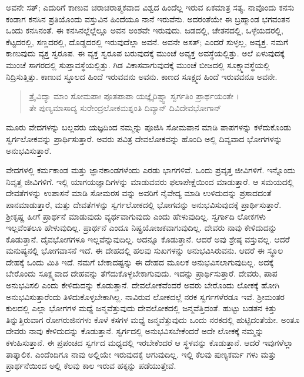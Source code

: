 ಅವನೇ ಸತ್​; ಎದುರಿಗೆ ಕಾಣುವ ಚರಾಚರಾತ್ಮಕವಾದ ವಿಶ್ವದ ಹಿಂದೆಲ್ಲ ಇರುವ ಏಕಮಾತ್ರ ಸತ್ಯ. ನಾವೊಂದು ಕನಸು ಕಂಡಾಗ ಕನಸಿನ ಪ್ರತಿಯೊಂದು ವಸ್ತುವಿನ ಹಿಂದೆಯೂ ನಾನೆ ಇರುವೆನು. ಅದರಂತೆಯೇ ಈ ಬ್ರಹ್ಮಾಂಡ ಭಗವಂತನ ಒಂದು ಕನಸಿನಂತೆ. ಈ ಕನಸಿನಲ್ಲೆಲ್ಲೆಲ್ಲೂ ಅವನ ಅಂಶವೇ ಇರುವುದು. ಜಡದಲ್ಲಿ, ಚೇತನದಲ್ಲಿ, ಒಳ್ಳೆಯದರಲ್ಲಿ, ಕೆಟ್ಟದರಲ್ಲಿ, ಸಣ್ಣದರಲ್ಲಿ, ದೊಡ್ಡದರಲ್ಲಿ ಇರುವುದೆಲ್ಲಾ ಅವನೆ. ಅವನೇ ಅಸತ್​; ಎಂದರೆ ಸುಳ್ಳಲ್ಲ, ಅವ್ಯಕ್ತ. ನಮಗೆ ಕಾಣುವುದು ವ್ಯಕ್ತ ಸ್ವರೂಪ. ಈ ವ್ಯಕ್ತ ಸ್ವರೂಪ ಬರುವುದಕ್ಕೆ ಮುಂಚೆ ಅವ್ಯಕ್ತ ಅವಸ್ಥೆಯಲ್ಲಿತ್ತು. ಅಲೆ ಏಳುವುದಕ್ಕೆ ಮುಂಚೆ ಸಾಗರದಲ್ಲಿ ಸುಪ್ತಾವಸ್ಥೆಯಲ್ಲಿತ್ತು. ಗಿಡ ವಿಕಾಸವಾಗುವುದಕ್ಕೆ ಮುಂಚೆ ಬೀಜದಲ್ಲಿ ಸೂಕ್ಷ್ಮಾವಸ್ಥೆಯಲ್ಲಿ ನಿದ್ರಿಸುತ್ತಿತ್ತು. ಕಾಣುವ ಸ್ಥೂಲದ ಹಿಂದೆ ಇರುವವನು ಅವನು. ಕಾಣದ ಸೂಕ್ಷ್ಮದ ಹಿಂದೆ ಇರುವವನೂ ಅವನೇ.

\begin{verse}
ತ್ರೈವಿದ್ಯಾ ಮಾಂ ಸೋಮಪಾಃ ಪೂತಪಾಪಾ ಯಜ್ಞೈರಿಷ್ಟ್ವಾ ಸ್ವರ್ಗತಿಂ ಪ್ರಾರ್ಥಯಂತೇ ।\\ತೇ ಪುಣ್ಯಮಾಸಾದ್ಯ ಸುರೇಂದ್ರಲೋಕಮಶ್ನಂತಿ ದಿವ್ಯಾನ್ ದಿವಿದೇವಭೋಗಾನ್ 
\end{verse}

{\small ಮೂರು ವೇದಗಳನ್ನು ಬಲ್ಲವರು ಯಜ್ಞದಿಂದ ನಮ್ಮನ್ನು ಪೂಜಿಸಿ ಸೋಮಪಾನ ಮಾಡಿ ಪಾಪಗಳನ್ನು ಕಳೆದುಕೊಂಡು ಸ್ವರ್ಗಲೋಕವನ್ನು ಪ್ರಾರ್ಥಿಸುತ್ತಾರೆ. ಅವರು ಪವಿತ್ರ ದೇವಲೋಕವನ್ನು ಹೊಂದಿ ಅಲ್ಲಿ ದಿವ್ಯವಾದ ಭೋಗಗಳನ್ನು ಅನುಭವಿಸುತ್ತಾರೆ.}

ವೇದಗಳಲ್ಲಿ ಕರ್ಮಕಾಂಡ ಮತ್ತು ಜ್ಞಾನಕಾಂಡಗಳೆಂದು ಎರಡು ಭಾಗಗಳಿವೆ. ಒಂದು ಪ್ರವೃತ್ತ ಜೀವಿಗಳಿಗೆ. ಇನ್ನೊಂದು ನಿವೃತ್ತ ಜೀವಿಗಳಿಗೆ. ಇಲ್ಲಿ ಯಾಗಯಜ್ಞಾದಿಗಳನ್ನು ಮಾಡುವವರು ಫಲಾಪೇಕ್ಷೆಯಿಂದ ಮಾಡುತ್ತಾರೆ. ಆ ಸಮಯದಲ್ಲಿ ದೇವತೆಗಳನ್ನು ಉಪಾಸನೆ ಮಾಡಿ ಸೋಮರಸ ವನ್ನು ಅವರಿಗೆ ನೈವೇದ್ಯ ಮಾಡಿ ಉಳಿದುದನ್ನು ಪ್ರಸಾದದಂತೆ ಪಾನಮಾಡುತ್ತಾರೆ, ಮತ್ತು ದೇವತೆಗಳನ್ನು ಸ್ವರ್ಗಲೋಕದಲ್ಲಿ ಭೋಗವನ್ನು ಅನುಭವಿಸುವುದಕ್ಕೆ ಪ್ರಾರ್ಥಿಸುತ್ತಾರೆ. ಶ್ರೀಕೃಷ್ಣ ಹೀಗೆ ಪ್ರಾರ್ಥನೆ ಮಾಡುವುದು ವ್ಯರ್ಥವಾಗುವುದು ಎಂದು ಹೇಳುವುದಿಲ್ಲ. ಸ್ವರ್ಗಾದಿ ಲೋಕಗಳು ಇಲ್ಲವೆಂತಲೂ ಹೇಳುವುದಿಲ್ಲ. ಪ್ರಾರ್ಥನೆ ಎಂದೂ ನಿಷ್ಪ್ರಯೋಜಕವಾಗುವುದಿಲ್ಲ. ದೇವರು ನಾವು ಕೇಳಿದುದನ್ನು ಕೊಡುತ್ತಾನೆ. ದೈವಭೋಗಗಳೂ ಇಲ್ಲವೆನ್ನುವುದಿಲ್ಲ. ಅದನ್ನೂ ಕೊಡುತ್ತಾನೆ. ಆದರೆ ಅವು ಶ್ರೇಷ್ಠ ವಸ್ತುವಲ್ಲ. ಆದರೆ ಮನುಷ್ಯನಲ್ಲಿ ಭೋಗವಾಸನೆ ಇದೆ. ಈ ದೇಹದಲ್ಲಿ ಹಲವು ಸುಖಗಳನ್ನು ಅನುಭವಿಸಿರುವನು. ಆದರೆ ಈ ಸ್ಥೂಲ ದೇಹಕ್ಕೆ ಒಂದು ಮಿತಿ ಇದೆ. ನಮಗೆ ಬೇಕಾದಷ್ಟನ್ನು ಈ ದೇಹದ ಮೂಲಕ ಅನುಭವಿಸಲಾಗುವುದಿಲ್ಲ. ಅದಕ್ಕೆ ಬೇರೊಂದು ಸೂಕ್ಷ್ಮವಾದ ದೇಹವನ್ನು ತೆಗೆದುಕೊಳ್ಳಬೇಕಾಗುವುದು. ಇದನ್ನು ಪ್ರಾರ್ಥಿಸುತ್ತಾರೆ. ದೇವರು, ಪಾಪ ಅನುಭವಿಸಲಿ ಎಂದು ಕೇಳಿದುದನ್ನು ಕೊಡುತ್ತಾನೆ. ದೇವಲೋಕವೆಂದರೆ ಅವರು ಬೇರೊಂದು ಲೋಕಕ್ಕೆ ಹೋಗಿ ಅನುಭವಿಸುತ್ತಾರೆಂದು ತಿಳಿದುಕೊಳ್ಳಬೇಕಾಗಿಲ್ಲ. ನಾವಿರುವ ಲೋಕದಲ್ಲೆ ನರಕ ಸ್ವರ್ಗಗಳೆರಡೂ ಇವೆ. ಶ್ರೀಮಂತರ ಕುಲದಲ್ಲಿ ಎಲ್ಲಾ ಭೋಗಗಳ ಮಧ್ಯೆ ಜನ್ಮವೆತ್ತುವುದು ದೇವಲೋಕದಲ್ಲಿ ಜನ್ಮವೆತ್ತಿದಂತೆ. ಹುಟ್ಟು ಬಡತನ ಕಿತ್ತು ತಿನ್ನುತ್ತಿರುವಾಗ ರೋಗರುಜಿನಗಳು ಕೊಳೆ ಕಸಗಳ ಮಧ್ಯೆ ಜನ್ಮವೆತ್ತುವುದು ಒಂದು ನರಕದಲ್ಲಿ ಹುಟ್ಟಿದಂತೆಯೇ. ಅಂತೂ ದೇವರು ನಾವು ಕೇಳಿದುದನ್ನು ಕೊಡುತ್ತಾನೆ. ಸ್ವರ್ಗದಲ್ಲಿ ಅನುಭವಿಸಬೇಕೆಂದರೆ ಅದೇ ಲೋಕಕ್ಕೆ ನಮ್ಮನ್ನು ಕಳುಹಿಸುತ್ತಾನೆ. ಈ ಪ್ರಪಂಚದ ಸ್ವರ್ಗದ ಮಧ್ಯದಲ್ಲಿ ಇರಬೇಕೆಂದರೆ ಆ ಸ್ಥಳವನ್ನು ಕೊಡುತ್ತಾನೆ. ಆದರೆ ಇವುಗಳೆಲ್ಲಾ ತಾತ್ಕಾಲಿಕ. ಎಂದೆಂದಿಗೂ ನಾವು ಅಲ್ಲಿಯೇ ಇರುವುದಕ್ಕೆ ಆಗುವುದಿಲ್ಲ. ಇಲ್ಲಿ ಕೆಲವು ಪುಣ್ಯಕರ್ಮ ಗಳು ಮತ್ತು ಪ್ರಾರ್ಥನೆಯಿಂದ ಅಲ್ಲಿ ಕೆಲವು ಕಾಲ ಇರುವ ಹಕ್ಕನ್ನು ಪಡೆಯುತ್ತೇವೆ.

